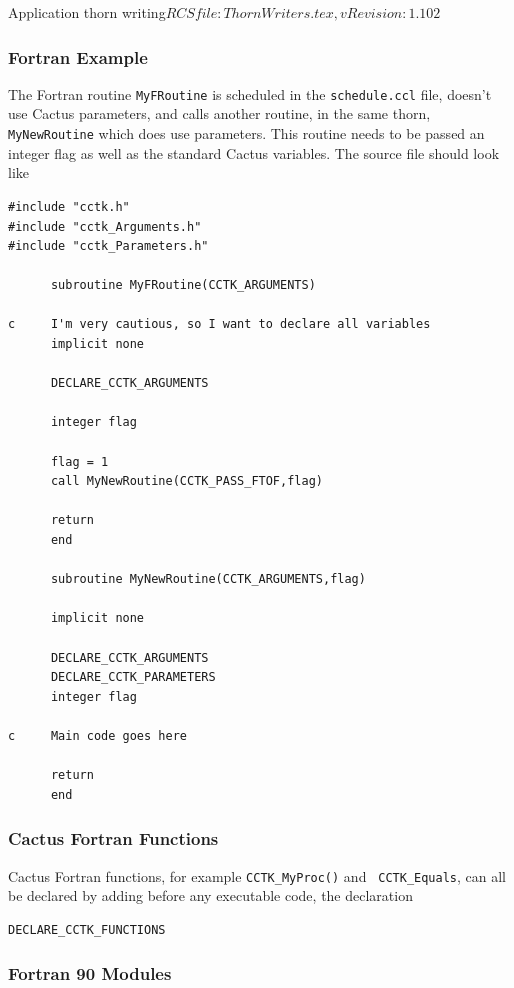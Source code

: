 \begin{cactuspart}{2}{Application thorn writing}{$RCSfile: ThornWriters.tex,v $}{$Revision: 1.102 $}
\subsubsection{Fortran Example}

The Fortran routine {\tt MyFRoutine} is scheduled in the {\tt schedule.ccl} file,
doesn't use Cactus parameters, and calls another routine, in the same thorn,
{\tt MyNewRoutine} which does use parameters.
This routine needs to be passed an integer flag as
well as the standard Cactus variables. The source file should look like

\begin{verbatim}
#include "cctk.h"
#include "cctk_Arguments.h"
#include "cctk_Parameters.h"

      subroutine MyFRoutine(CCTK_ARGUMENTS)

c     I'm very cautious, so I want to declare all variables
      implicit none

      DECLARE_CCTK_ARGUMENTS

      integer flag

      flag = 1
      call MyNewRoutine(CCTK_PASS_FTOF,flag)

      return
      end

      subroutine MyNewRoutine(CCTK_ARGUMENTS,flag)

      implicit none

      DECLARE_CCTK_ARGUMENTS
      DECLARE_CCTK_PARAMETERS
      integer flag

c     Main code goes here

      return
      end

\end{verbatim}

\subsubsection{Cactus Fortran Functions}

Cactus Fortran functions, for example {\tt CCTK\_MyProc()} and {\tt
CCTK\_Equals}, can all be declared by adding before any executable code, the
declaration

\begin{verbatim}
DECLARE_CCTK_FUNCTIONS
\end{verbatim}

\subsubsection{Fortran 90 Modules}


\end{cactuspart}
